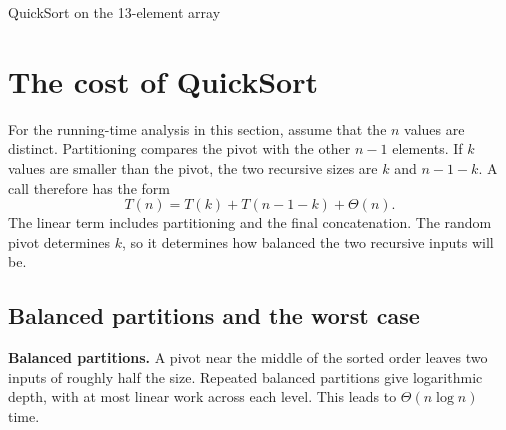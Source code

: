 \documentclass[a4paper,12pt,oneside]{report}
\begin{document}
\begin{framedexample}{QuickSort on the 13-element array}
\begin{center}
\end{center}
\end{framedexample}

\section{The cost of QuickSort}

For the running-time analysis in this section, assume that the $n$
values are distinct. Partitioning compares the pivot with the other
$n-1$ elements. If $k$ values are smaller than the pivot, the two
recursive sizes are $k$ and $n-1-k$. A call therefore has the form
\[
  T(n)=T(k)+T(n-1-k)+\Theta(n).
\]
The linear term includes partitioning and the final concatenation.
The random pivot determines $k$, so it determines how balanced the
two recursive inputs will be.

\subsection{Balanced partitions and the worst case}

\textbf{Balanced partitions.}
A pivot near the middle of the sorted order leaves two inputs of
roughly half the size. Repeated balanced partitions give logarithmic
depth, with at most linear work across each level. This leads to
$\Theta(n\log n)$ time.
\end{document}
